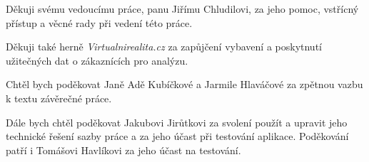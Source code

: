 Děkuji svému vedoucímu práce, panu Jiřímu Chludilovi, za jeho pomoc, vstřícný přístup a věcné rady při vedení této práce.

Děkuji také herně \emph{Virtualnirealita.cz} za zapůjčení vybavení a poskytnutí užitečných dat o zákaznících pro analýzu.

Chtěl bych poděkovat Janě Adě Kubíčkové a Jarmile Hlaváčové za zpětnou vazbu k textu závěrečné práce.

Dále bych chtěl poděkovat Jakubovi Jirůtkovi za svolení použít a upravit jeho technické řešení sazby práce a za jeho účast při testování aplikace. Poděkování patří i Tomášovi Havlíkovi za jeho účast na testování.